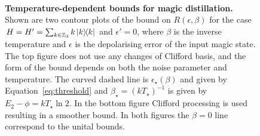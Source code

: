 \documentclass[pra,
aps,
twocolumn,
superscriptaddress,
groupedaddress,
nofootinbib,
reprint
]{revtex4-1}
\begin{document}
\begin{figure}[t!]
    \centering
    \\
    \caption{\textbf{Temperature-dependent bounds for magic distillation.} Shown are two contour plots of the bound on $R(\epsilon, \beta)$ for the case $H = H' = \sum_{k \in \mathbb{Z}_3} k \ketbra{k}$ and $\epsilon' = 0$, where $\beta$ is the inverse temperature and $\epsilon$ is the depolarising error of the input magic state. 
The top figure  does not use any changes of Clifford basis, and the form of the bound depends on both the noise parameter and temperature. The curved dashed line is $\epsilon_\star(\beta)$ and given by Equation~\ref{eq:threshold} and $\beta_\star = (kT_\star)^{-1}$ is given by $E_2-\phi = kT_\star \ln 2$. 
In the bottom figure  Clifford processing is used resulting in a smoother bound. In both figures the $\beta = 0$ line correspond to the unital bounds.}
    \label{fig:rate_contour}
\end{figure}
\end{document}
